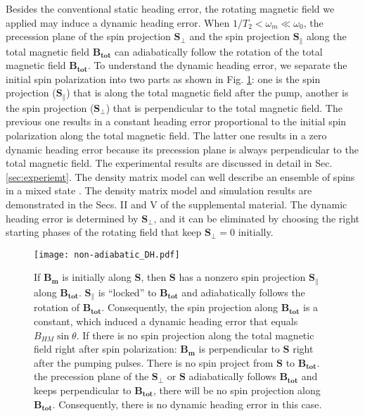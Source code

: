 \documentclass[prx,twocolumn,10pt,nofootinbib]{revtex4-1}
\begin{document}
Besides the conventional static heading error, the rotating magnetic field we applied may induce a dynamic heading error. When $1/T_2<\omega_m \ll \omega_0$, the precession plane of the spin projection $\bm{S_{\perp}}$ and the spin projection $\bm{S_{\parallel}}$ along the total magnetic field $\bm{B_{tot}}$ can adiabatically follow the rotation of the total magnetic field $\bm{B_{tot}}$. To understand the dynamic heading error, we separate the initial spin polarization into two parts as shown in Fig. \ref{fig:non-adiabatic_DH}: one is the spin projection ($\bm{S_{\parallel}}$) that is along the total magnetic field after the pump, another is the spin projection ($\bm{S_{\perp}}$) that is perpendicular to the total magnetic field. The previous one results in a constant heading error proportional to the initial spin polarization along the total magnetic field. The latter one results in a zero dynamic heading error because its precession plane is always perpendicular to the total magnetic field.  The experimental results are discussed in detail in Sec. \ref{sec:experiemt}. The density matrix model can well describe an ensemble of spins in a mixed state \cite{walker1997spin}. The density matrix model and simulation results are demonstrated in the Secs. II and V of the supplemental material. The dynamic heading error is determined by $\bm{S_{\perp}}$, and it can be eliminated by choosing the right starting phases of the rotating field that keep $\bm{S_{\perp}}=0$ initially.
\begin{figure}[H]
\centering
\texttt{[image: non-adiabatic\_DH.pdf]}
\caption{If $\bm{B_m}$ is initially along $\bm{S}$, then $\bm{S}$ has a nonzero spin projection $\bm{S_{\parallel}}$ along  $\bm{B_{tot}}$. $\bm{S_{\parallel}}$ is ``locked” to $\bm{B_{tot}}$ and adiabatically follows the rotation of $\bm{B_{tot}}$. Consequently, the spin projection along $\bm{B_{tot}}$ is a constant, which induced a dynamic heading error that equals $B_{HM} \sin \theta$. If there is no spin projection along the total magnetic field right after spin polarization: $\bm{B_m}$ is perpendicular to $\bm{S}$ right after the pumping pulses. There is no spin project from $\bm{S}$ to $\bm{B_{tot}}$. the precession plane of the $\bm{S_{\perp}}$ or $\bm{S}$ adiabatically follows $\bm{B_{tot}}$ and keeps perpendicular to $\bm{B_{tot}}$, there will be no spin projection along $\bm{B_{tot}}$. Consequently, there is no dynamic heading error in this case.}
\label{fig:non-adiabatic_DH}
\end{figure}
\end{document}
